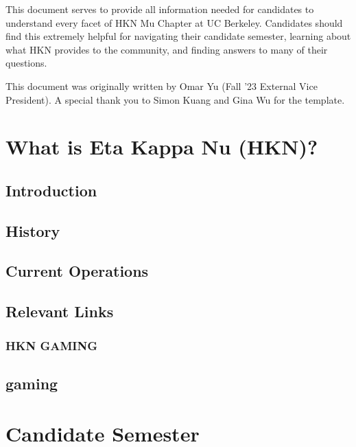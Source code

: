 \documentclass[11pt, article, oneside]{memoir}
\begin{document}
	\maketitle
	
	This document serves to provide all information needed for candidates to understand every facet of HKN Mu Chapter at UC Berkeley. Candidates should find this extremely helpful for navigating their candidate semester, learning about what HKN provides to the community, and finding answers to many of their questions.
    \bigbreak

    This document was originally written by Omar Yu (Fall '23 External Vice President). A special thank you to Simon Kuang and Gina Wu for the template.
    
	
	\tableofcontents*
	\newpage

    
	\chapter{What is Eta Kappa Nu (HKN)?}
    \section{Introduction}
    \section{History}
    \section{Current Operations}
    \section{Relevant Links}


    \subsection{HKN GAMING}

    \section{gaming}

    \newpage
    \chapter{Candidate Semester}
\end{document}
